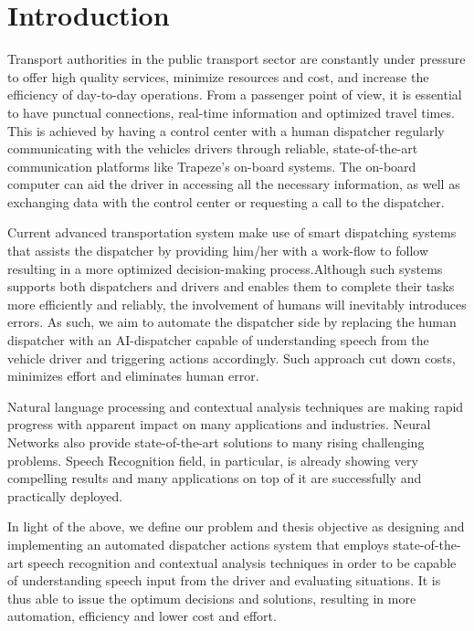 \chapter{Introduction}
\label{chap:intro}

Transport authorities in the public transport sector are constantly under pressure to offer high quality services, minimize resources and cost, and increase the efficiency of day-to-day operations. From a passenger point of view, it is essential to have punctual connections, real-time information and optimized travel times. This is achieved by having a control center with a human dispatcher regularly communicating with the vehicles drivers through reliable, state-of-the-art communication platforms like Trapeze's on-board systems. The on-board computer can aid the driver in accessing all the necessary information, as well as exchanging data with the control center or requesting a call to the dispatcher. 

Current advanced transportation system make use of smart dispatching systems that assists the dispatcher by providing him/her with a work-flow to follow resulting in a more optimized decision-making process.Although such systems supports both dispatchers and drivers and enables them to complete their tasks more efficiently and reliably, the involvement of humans will inevitably introduces errors. As such, we aim to automate the dispatcher side by replacing the human dispatcher with an AI-dispatcher capable of understanding speech from the vehicle driver and triggering actions accordingly. Such approach cut down costs, minimizes effort and eliminates human error. 


Natural language processing and contextual analysis techniques are making rapid progress with apparent impact on many applications and industries. Neural Networks also provide state-of-the-art solutions to many rising challenging problems. Speech Recognition field, in particular, is already showing very compelling results and many applications on top of it are successfully and practically deployed.


In light of the above, we define our problem and thesis objective as designing and implementing an automated dispatcher actions system that employs state-of-the-art speech recognition and contextual analysis techniques in order to be capable of understanding speech input from the driver and evaluating situations. It is thus able to issue the optimum decisions and solutions, resulting in more automation, efficiency and lower cost and effort.

